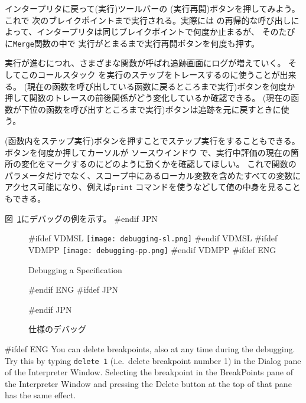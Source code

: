 \documentclass[\pformat,12pt]{article}
\newcommand{\aaa}{\tt }
\newcommand{\cmd}{\tt }
\newcommand{\guicmd}[1]{{\sf #1}}
\newcommand{\guicmd}[1]{{\gt #1}}
\begin{document}
インタープリタに戻って(\guicmd{実行})ツールバーの
(\guicmd{実行再開})ボタンを押してみよう。これで
次のブレイクポイントまで実行される。実際には
\ifthenelse{\boolean{VDMsl}}{{\aaa MergeSort}}{{\aaa Sort}}
の再帰的な呼び出しによって、インタープリタは同じブレイクポイントで何度か止まるが、
そのたびに{\tt Merge}関数の中で
実行がとまるまで\guicmd{実行再開}ボタンを何度も押す。

実行が進むにつれ、さまざまな関数が呼ばれ\guicmd{追跡}画面にログが増えていく。
そしてこのコールスタック を実行のステップをトレースするのに使うことが出来る。 
(\guicmd{現在の函数を呼び出している函数に戻るところまで実行})ボタンを何度か押して関数のトレースの前後関係がどう変化しているか確認できる。 
(\guicmd{現在の函数が下位の函数を呼び出すところまで実行})ボタンは追跡を元に戻すときに使う。

(\guicmd{函数内をステップ実行})ボタンを押すことでステップ実行をすることもできる。ボタンを何度か押してカーソルが
\guicmd{ソースウインドウ} で、実行中評価の現在の箇所の変化をマークするのにどのように動くかを確認してほしい。
これで関数のパラメータだけでなく、スコープ中にあるローカル変数を含めたすべての変数に
アクセス可能になり、例えば{\cmd print} コマンドを使うなどして値の中身を見ることもできる。

図~\ref{fig:guidebug}にデバッグの例を示す。
#endif JPN

\begin{figure}[tbh]
\begin{center}
#ifdef VDMSL
\texttt{[image: debugging-sl.png]}
#endif VDMSL
#ifdef VDMPP
\texttt{[image: debugging-pp.png]}
#endif VDMPP
#ifdef ENG
\caption{Debugging a Specification}
#endif ENG
#ifdef JPN
\caption{仕様のデバッグ}
#endif JPN

\label{fig:guidebug}
\end{center}
\end{figure}

#ifdef ENG
You can delete breakpoints, also at any time during the
debugging. Try this by typing 
{\tt delete 1} (i.e.\ delete breakpoint number 1) in the
\guicmd{Dialog} pane of the \guicmd{Interpreter Window}. Selecting the
breakpoint in the \guicmd{BreakPoints} pane of the \guicmd{Interpreter
  Window} and pressing the \guicmd{Delete} button at the top of that
pane has the same effect.
\end{document}
